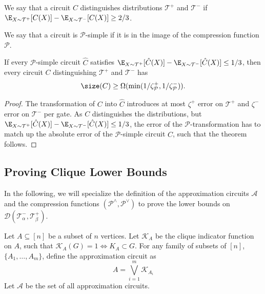 
\begin{definition}
    We say that a circuit $C$ distinguishes distributions $\mathcal{T}^+$ and $\mathcal{T}^-$ if $\E_{X \sim \mathcal{T}^+} [C(X)] - \E_{X\sim \mathcal{T}^{-}} [C(X)] \geq 2/3$.
\end{definition} 
We say that a circuit is $\mathcal{P}$-simple if it is in the image of the compression function $\mathcal{P}$. 
\begin{lemma}
\label{lem:extended-approximation}
    If every $\mathcal{P}$-simple circuit $\hat{C}$ satisfies $\E_{X \sim \mathcal{T}^+} [\hat{C}(X)] - \E_{X\sim \mathcal{T}^{-}} [\hat{C}(X)] \leq 1/3$, then every circuit $C$ distinguishing $\mathcal{T}^+$ and $\mathcal{T}^-$ has 
    \begin{equation*}
        \size(C) \geq \Omega(\min(1/\zeta^+_{\mathcal{P}}, 1/\zeta^-_{\mathcal{P}})).
    \end{equation*}
\end{lemma}
\begin{proof}
    The transformation of $C$ into $\hat{C}$ introduces at most $\zeta^+$ error on $\mathcal{T}^+$ and $\zeta^-$ error on $\mathcal{T}^-$ per gate. As $C$ distinguishes the distributions, but $\E_{X \sim \mathcal{T}^+} [\hat{C}(X)] - \E_{X\sim \mathcal{T}^{-}} [\hat{C}(X)] \leq 1/3$, the error of the $\mathcal{P}$-transformation has to match up the absolute error of the $\mathcal{P}$-simple circuit $\hat{C}$, such that the theorem follows.
\end{proof}


\subsection{Proving Clique Lower Bounds}

In the following, we will specialize the definition of the approximation circuits $\mathcal{A}$ and the compression functions $(\mathcal{P}^\wedge, \mathcal{P}^\vee)$ to prove the lower bounds on $\mathcal{D}(\mathcal{T}^-_\alpha, \mathcal{T}^+_\beta)$.

\begin{definition}
    Let $A \subseteq [n]$ be a subset of $n$ vertices. Let $\mathcal{K}_A$ be the clique indicator function on $A$, such that $\mathcal{K}_A(G)=1 \Leftrightarrow K_A \subset G$. For any family of subsets of $[n]$, $\{A_1, \ldots, A_m\}$, define the approximation circuit as 
    \begin{equation*}
        A = \bigvee_{i=1}^{m} \mathcal{K}_{A_i}
    \end{equation*}
    Let $\mathcal{A}$ be the set of all approximation circuits.
\end{definition}

